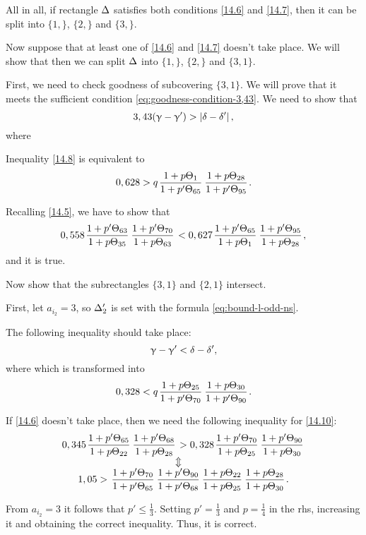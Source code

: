 All in all, if rectangle $\Delta$ satisfies both conditions \ref{14.6} and \ref{14.7},
then it can be split into $\{1,\}$, $\{2,\}$ and $\{3,\}$.

Now suppose that at least one of \ref{14.6} and \ref{14.7} doesn't take place.
We will show that then we can split $\Delta$ into $\{1,\}$, $\{2,\}$ and $\{3,1\}$.

First, we need to check goodness of subcovering $\{3,1\}$.
We will prove that it meets the sufficient condition \ref{eq:goodness-condition-3,43}.
We need to show that
\begin{equation}\label{14.8}
	3,43 (\upgamma - \upgamma') > \left| \delta - \delta' \right|,
\end{equation}
where

Inequality \ref{14.8} is equivalent to
\begin{equation*}
	0,628 > q \up{1}{65} \up{28}{95}.
\end{equation*}

Recalling \ref{14.5}, we have to show that
\begin{equation*}
	0,558 \pu{63}{35} \pu{70}{63}
	< 0,627 \pu{65}{1} \pu{95}{28},
\end{equation*}
and it is true.

Now show that the subrectangles $\{3,1\}$ and $\{2, 1\}$ intersect.

First, let $a_{i_2} = 3$, so $\Delta_2'$ is set with the formula \ref{eq:bound-l-odd-ns}.

The following inequality should take place:
\begin{equation}\label{14.9}
	\upgamma - \upgamma' < \delta - \delta',
\end{equation}
where
which is transformed into
\begin{equation}\label{14.10}
	0,328 < q \up{25}{70} \up{30}{90}.
\end{equation}

If \ref{14.6} doesn't take place, then we need the following inequality for \ref{14.10}:
\begin{gather*}
	0,345 \pu{65}{22} \pu{68}{28} > 0,328 \pu{70}{25} \pu {90}{30}\\
	\ArrowBetweenLines
	1,05 > \pp {70}{65} \pp{90}{68} \uu{22}{25} \uu{28}{30}.
\end{gather*}

From $a_{i_2} = 3$ it follows that $p' \leqslant \frac{1}{3}$.
Setting $p' = \frac{1}{3}$ and $p = \frac{1}{4}$ in the rhs, increasing it and obtaining the correct inequality.
Thus, it is correct.


